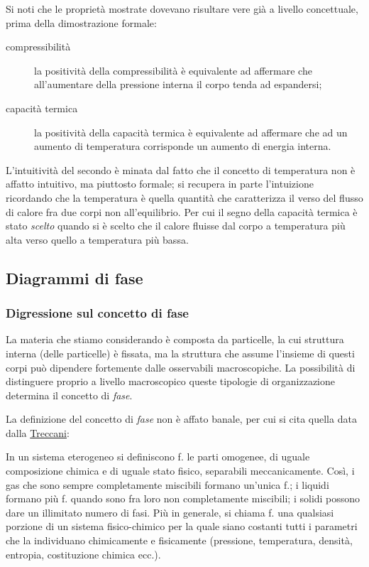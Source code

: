 Si noti che le proprietà mostrate dovevano risultare vere già a livello concettuale, prima della dimostrazione formale:
\begin{description}
	\item[compressibilità] la positività della compressibilità è equivalente ad affermare che all'aumentare della pressione interna il corpo tenda ad espandersi;
	\item[capacità termica] la positività della capacità termica è equivalente ad affermare che ad un aumento di temperatura corrisponde un aumento di energia interna.
\end{description}

L'intuitività del secondo è minata dal fatto che il concetto di temperatura non è affatto intuitivo, ma piuttosto formale; si recupera in parte l'intuizione ricordando che la temperatura è quella quantità che caratterizza il verso del flusso di calore fra due corpi non all'equilibrio. Per cui il segno della capacità termica è stato \textit{scelto} quando si è scelto che il calore fluisse dal corpo a temperatura più alta verso quello a temperatura più bassa.

\subsection{Diagrammi di fase}

\subsubsection{Digressione sul concetto di fase}
La materia che stiamo considerando è composta da particelle, la cui struttura interna (delle particelle) è fissata, ma la struttura che assume l'insieme di questi corpi può dipendere fortemente dalle osservabili macroscopiche. La possibilità di distinguere proprio a livello macroscopico queste tipologie di organizzazione determina il concetto di \textit{fase}.

La definizione del concetto di \textit{fase} non è affato banale, per cui si cita quella data dalla \href{http://www.treccani.it/enciclopedia/fase/#chimica-1}{Treccani}:

\begin{defn}[Fase]
	In un sistema eterogeneo si definiscono f. le parti omogenee, di uguale composizione chimica e di uguale stato fisico, separabili meccanicamente. Così, i gas che sono sempre completamente miscibili formano un’unica f.; i liquidi formano più f. quando sono fra loro non completamente miscibili; i solidi possono dare un illimitato numero di fasi. Più in generale, si chiama f. una qualsiasi porzione di un sistema fisico-chimico per la quale siano costanti tutti i parametri che la individuano chimicamente e fisicamente (pressione, temperatura, densità, entropia, costituzione chimica ecc.).
\end{defn}

